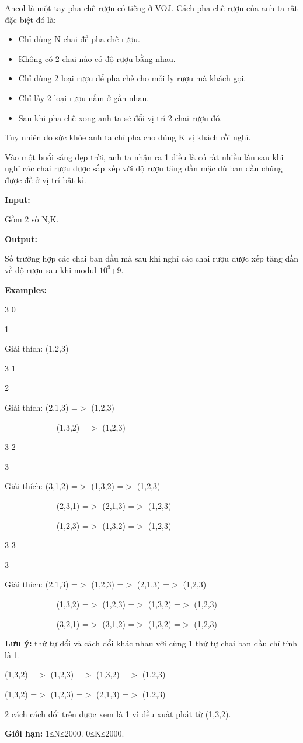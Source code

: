 

Ancol là một tay pha chế rượu có tiếng ở VOJ. Cách pha chế rượu của anh ta rất đặc biệt đó là:
\begin{itemize}
	\item Chỉ dùng N chai để pha chế rượu.
	\item Không có 2 chai nào có độ rượu bằng nhau.
	\item Chỉ dùng 2 loại rượu để pha chế cho mỗi ly rượu mà khách gọi.
	\item Chỉ lấy 2 loại rượu nằm ở gần nhau.
	\item Sau khi pha chế xong anh ta sẽ đổi vị trí 2 chai rượu đó.
\end{itemize}

Tuy nhiên do sức khỏe anh ta chỉ pha cho đúng K vị khách rồi nghỉ.

Vào một buổi sáng đẹp trời, anh ta nhận ra 1 điều là có rất nhiều lần sau khi nghỉ các chai rượu được sắp xếp với độ rượu tăng dần mặc dù ban đầu chúng được đề ở vị trí bất kì.

\textbf{Input:}

Gồm 2 số N,K.

\textbf{Output:}

Số trường hợp các chai ban đầu mà sau khi nghỉ các chai rượu được xếp tăng dần về độ rượu sau khi modul $10^{9}$+9.

\textbf{Examples:}

3 0       

1   

Giải thích: (1,2,3)

3 1 

2                  

Giải thích: (2,1,3) =$>$ (1,2,3)

               (1,3,2) =$>$ (1,2,3)

3 2                            

3

Giải thích: (3,1,2) =$>$ (1,3,2) =$>$ (1,2,3)

               (2,3,1) =$>$ (2,1,3) =$>$ (1,2,3)

               (1,2,3) =$>$ (1,3,2) =$>$ (1,2,3)

3 3    

3                

Giải thích: (2,1,3) =$>$ (1,2,3) =$>$ (2,1,3) =$>$ (1,2,3)

               (1,3,2) =$>$ (1,2,3) =$>$ (1,3,2) =$>$ (1,2,3)

               (3,2,1) =$>$ (3,1,2) =$>$ (1,3,2) =$>$ (1,2,3)

\textbf{Lưu ý:} thứ tự đổi và cách đổi khác nhau với cùng 1 thứ tự chai ban đầu chỉ tính là 1.

(1,3,2) =$>$ (1,2,3) =$>$ (1,3,2) =$>$ (1,2,3)

(1,3,2) =$>$ (1,2,3) =$>$ (2,1,3) =$>$ (1,2,3)

2 cách cách đổi trên được xem là 1 vì đều xuất phát từ (1,3,2).

\textbf{Giới hạn:} 1≤N≤2000. 0≤K≤2000.

 

 
